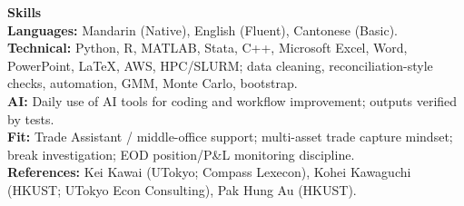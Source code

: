 \documentclass[11pt,letterpaper]{article}
\begin{document}
\vspace{0.15pt}

{\large \textbf{Skills}}\\[-0.5pt]
\textbf{Languages:} Mandarin (Native), English (Fluent), Cantonese (Basic).\\
\textbf{Technical:} Python, R, MATLAB, Stata, C++, Microsoft Excel, Word, PowerPoint, \LaTeX, AWS, HPC/SLURM; data cleaning, reconciliation-style checks, automation, GMM, Monte Carlo, bootstrap.\\
\textbf{AI:} Daily use of AI tools for coding and workflow improvement; outputs verified by tests.\\
\textbf{Fit:} Trade Assistant / middle-office support; multi-asset trade capture mindset; break investigation; EOD position/P\&L monitoring discipline.\\
\textbf{References:} Kei Kawai (UTokyo; Compass Lexecon), Kohei Kawaguchi (HKUST; UTokyo Econ Consulting), Pak Hung Au (HKUST).
\end{document}
